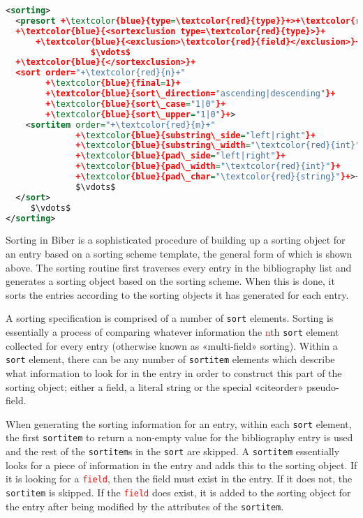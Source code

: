 \documentclass{ltxdockit}
\newcommand*{\biber}{Biber\xspace}
\begin{document}
\begin{lstlisting}[language=xml,escapechar=+,mathescape=true]
<sorting>
  <presort +\textcolor{blue}{type=\textcolor{red}{type}}+>+\textcolor{red}{string}+</presort>
  +\textcolor{blue}{<sortexclusion type=\textcolor{red}{type}>}+
      +\textcolor{blue}{<exclusion>\textcolor{red}{field}</exclusion>}+
                 $\vdots$
  +\textcolor{blue}{</sortexclusion>}+
  <sort order="+\textcolor{red}{n}+"
        +\textcolor{blue}{final=1}+
        +\textcolor{blue}{sort\_direction="ascending|descending"}+
        +\textcolor{blue}{sort\_case="1|0"}+
        +\textcolor{blue}{sort\_upper="1|0"}+>
    <sortitem order="+\textcolor{red}{m}+"
              +\textcolor{blue}{substring\_side="left|right"}+
              +\textcolor{blue}{substring\_width="\textcolor{red}{int}"}+
              +\textcolor{blue}{pad\_side="left|right"}+
              +\textcolor{blue}{pad\_width="\textcolor{red}{int}"}+
              +\textcolor{blue}{pad\_char="\textcolor{red}{string}"}+>+\textcolor{red}{field|literal|citeorder}+</sortitem>
              $\vdots$
  </sort>
     $\vdots$
</sorting>
\end{lstlisting}

Sorting in \biber is a sophisticated procedure of building up a sorting
object for an entry based on a sorting scheme template, the general form of
which is shown above. The sorting routine first traverses every entry in
the bibliography list and generates a sorting object based on the sorting
scheme. When this is done, it sorts the entries according to the sorting
objects it has generated for each entry.

A sorting specification is comprised of a number of \texttt{sort} elements.
Sorting is essentially a process of comparing whatever information the \textcolor{red}{n}th
\texttt{sort} element collected for every entry (otherwise known as
«multi-field» sorting). Within a \texttt{sort} element, there can be any
number of \texttt{sortitem} elements which describe what information to
look for in the entry in order to construct this part of the sorting
object; either a field, a literal string or the special «citeorder»
pseudo-field.

When generating the sorting information for an entry, within each
\texttt{sort} element, the first \texttt{sortitem} to return a non-empty
value for the bibliography entry is used and the rest of the
\texttt{sortitem}s in the \texttt{sort} are skipped. A \texttt{sortitem}
essentially looks for a piece of information in the entry and adds this to
the sorting object. If it is looking for a \textcolor{red}{\texttt{field}},
then the field must exist in the entry. If it does not, the
\texttt{sortitem} is skipped. If the \textcolor{red}{\texttt{field}} does
exist, it is added to the sorting object for the entry after being modified
by the attributes of the \texttt{sortitem}.
\end{document}
